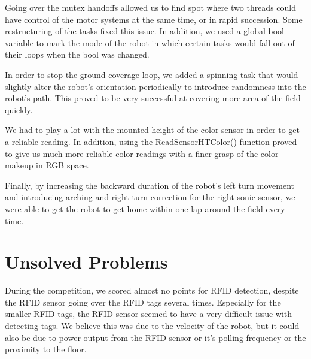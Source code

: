 \documentclass[journal]{IEEEtran}
\begin{document}
Going over the mutex handoffs allowed us to find spot where two threads could have control of the motor systems at the same time, or in rapid succession. Some restructuring of the tasks fixed this issue. In addition, we used a global bool variable to mark the mode of the robot in which certain tasks would fall out of their loops when the bool was changed.

In order to stop the ground coverage loop, we added a spinning task that would slightly alter the robot's orientation periodically to introduce randomness into the robot's path. This proved to be very successful at covering more area of the field quickly. 

We had to play a lot with the mounted height of the color sensor in order to get a reliable reading. In addition, using the ReadSensorHTColor() function proved to give us much more reliable color readings with a finer grasp of the color makeup in RGB space. 

Finally, by increasing the backward duration of the robot's left turn movement and introducing arching and right turn correction for the right sonic sensor, we were able to get the robot to get home within one lap around the field every time.

\section{Unsolved Problems}\label{S.unsolved}
During the competition, we scored almost no points for RFID detection, despite the RFID sensor going over the RFID tags several times. Especially for the smaller RFID tags, the RFID sensor seemed to have a very difficult issue with detecting tags. We believe this was due to the velocity of the robot, but it could also be due to power output from the RFID sensor or it's polling frequency or the proximity to the floor. 
\end{document}
